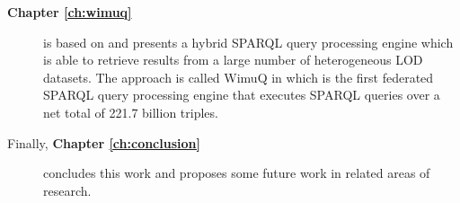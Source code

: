 \begin{description}
    \item[\textbf{Chapter \ref{ch:wimuq}}] is based on \cite{ValdestilhasKcap} and presents a hybrid SPARQL query processing engine which is able to retrieve results from a large number of heterogeneous LOD datasets. The approach is called WimuQ in which is the first federated SPARQL query processing engine that executes SPARQL queries over a net total of 221.7 billion triples.
    
    \item[Finally, \textbf{Chapter \ref{ch:conclusion}}] concludes this work and proposes some future work in related areas of research.
\end{description}
